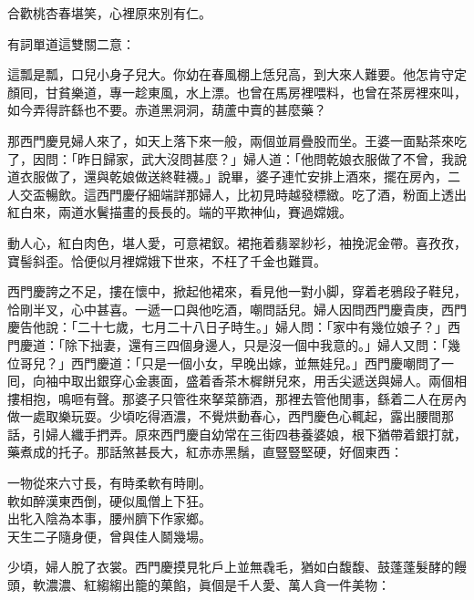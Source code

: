 \begin{myquote} 
合歡桃杏春堪笑，心裡原來別有仁。
\end{myquote} 

有詞單道這雙關二意：

\begin{myquote} 
這瓢是瓢，口兒小身子兒大。你幼在春風棚上恁兒高，到大來人難要。他怎肯守定顏囘，甘貧樂道，專一趁東風，水上漂。也曾在馬房裡喂料，也曾在茶房裡來叫，如今弄得許繇也不要。赤道黑洞洞，葫蘆中賣的甚麼藥？
\end{myquote} 

那西門慶見婦人來了，如天上落下來一般，兩個並肩疊股而坐。王婆一面點茶來吃了，因問：「昨日歸家，武大沒問甚麼？」婦人道：「他問乾娘衣服做了不曾，我說道衣服做了，還與乾娘做送終鞋襪。」說畢，婆子連忙安排上酒來，擺在房內，二人交盃暢飲。這西門慶仔細端詳那婦人，比初見時越發標緻。吃了酒，粉面上透出紅白來，兩道水鬢描畫的長長的。端的平欺神仙，賽過嫦娥。

\begin{myquote} 
動人心，紅白肉色，堪人愛，可意裙釵。裙拖着翡翠紗衫，袖挽泥金帶。喜孜孜，寶髻斜歪。恰便似月裡嫦娥下世來，不枉了千金也難買。

\end{myquote} 

西門慶誇之不足，摟在懷中，掀起他裙來，看見他一對小脚，穿着老鴉段子鞋兒，恰剛半叉，心中甚喜。一遞一口與他吃酒，嘲問話兒。婦人因問西門慶貴庚，西門慶告他說：「二十七歲，七月二十八日子時生。」婦人問：「家中有幾位娘子？」西門慶道：「除下拙妻，還有三四個身邊人，只是沒一個中我意的。」婦人又問：「幾位哥兒？」西門慶道：「只是一個小女，早晚出嫁，並無娃兒。」西門慶嘲問了一囘，向袖中取出銀穿心金裹面，盛着香茶木樨餅兒來，用舌尖遞送與婦人。兩個相摟相抱，鳴咂有聲。那婆子只管徃來拏菜篩酒，那裡去管他閒事，繇着二人在房內做一處取樂玩耍。少頃吃得酒濃，不覺烘動春心，西門慶色心輒起，露出腰間那話，引婦人纖手捫弄。原來西門慶自幼常在三街四巷養婆娘，根下猶帶着銀打就，藥煮成的托子。那話煞甚長大，紅赤赤黑鬚，直豎豎堅硬，好個東西：

\begin{myquote} 
一物從來六寸長，有時柔軟有時剛。\\軟如醉漢東西倒，硬似風僧上下狂。\\出牝入陰為本事，腰州臍下作家鄉。\\天生二子隨身便，曾與佳人鬬幾場。{}
\end{myquote} 

少頃，婦人脫了衣裳。西門慶摸見牝戶上並無毳毛，猶如白馥馥、鼓蓬蓬髮酵的饅頭，軟濃濃、紅縐縐出籠的菓餡，眞個是千人愛、萬人貪一件美物：

